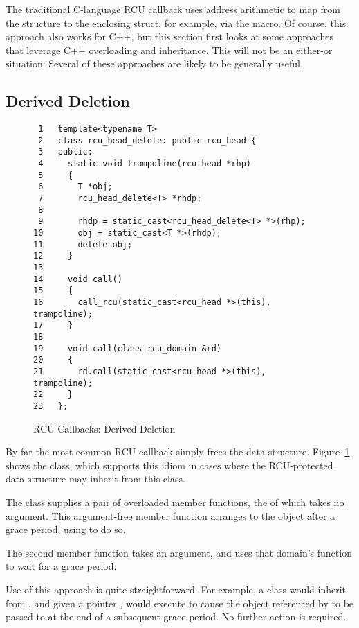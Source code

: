 \documentclass[letterpaper,twocolumn,10pt]{article}
\begin{document}
The traditional C-language RCU callback uses address arithmetic
to map from the  structure to the enclosing struct,
for example, via the  macro.
Of course, this approach also works for C++, but this section first
looks at some approaches that leverage C++ overloading and inheritance.
This will not be an either-or situation: Several of these approaches
are likely to be generally useful.

\subsection{Derived Deletion}
\label{sec:Derived Deletion}

\begin{figure}[tbp]
{ \scriptsize
\begin{verbatim}
 1   template<typename T>
 2   class rcu_head_delete: public rcu_head {
 3   public:
 4     static void trampoline(rcu_head *rhp)
 5     {
 6       T *obj;
 7       rcu_head_delete<T> *rhdp;
 8
 9       rhdp = static_cast<rcu_head_delete<T> *>(rhp);
10       obj = static_cast<T *>(rhdp);
11       delete obj;
12     }
13
14     void call()
15     {
16       call_rcu(static_cast<rcu_head *>(this), trampoline);
17     }
18
19     void call(class rcu_domain &rd)
20     {
21       rd.call(static_cast<rcu_head *>(this), trampoline);
22     }
23   };
\end{verbatim}
}
\caption{RCU Callbacks: Derived Deletion}
\label{fig:RCU Callbacks: Derived Deletion}
\end{figure}

By far the most common RCU callback simply frees the data structure.
Figure~\ref{fig:RCU Callbacks: Derived Deletion}
shows the  class, which supports this idiom
in cases where the RCU-protected data structure may inherit
from this class.

The  class supplies a pair of overloaded 
member functions, the of which takes no argument.
This argument-free member function arranges to  the
object after a grace period, using  to do so.

The second  member function takes an 
argument, and uses that domain's  function to wait
for a grace period.

Use of this approach is quite straightforward.
For example, a class  would inherit from
, and given a  pointer ,
would execute  to cause the object referenced
by  to be passed to  at the end of a subsequent
grace period.
No further action is required.
\end{document}
